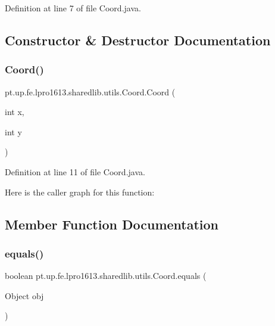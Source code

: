 Definition at line 7 of file Coord.\+java.



\subsection{Constructor \& Destructor Documentation}
\hypertarget{classpt_1_1up_1_1fe_1_1lpro1613_1_1sharedlib_1_1utils_1_1_coord_a43ebef088b4a7b390ac60f7fb4a200bb}{}\label{classpt_1_1up_1_1fe_1_1lpro1613_1_1sharedlib_1_1utils_1_1_coord_a43ebef088b4a7b390ac60f7fb4a200bb} 
\subsubsection{\texorpdfstring{Coord()}{Coord()}}
{\footnotesize\ttfamily pt.\+up.\+fe.\+lpro1613.\+sharedlib.\+utils.\+Coord.\+Coord (\begin{DoxyParamCaption}\item[{int}]{x,  }\item[{int}]{y }\end{DoxyParamCaption})}



Definition at line 11 of file Coord.\+java.

Here is the caller graph for this function\+:


\subsection{Member Function Documentation}
\hypertarget{classpt_1_1up_1_1fe_1_1lpro1613_1_1sharedlib_1_1utils_1_1_coord_ab7b6eb36dbf1fe7df81fb9cfedeed2eb}{}\label{classpt_1_1up_1_1fe_1_1lpro1613_1_1sharedlib_1_1utils_1_1_coord_ab7b6eb36dbf1fe7df81fb9cfedeed2eb} 
\subsubsection{\texorpdfstring{equals()}{equals()}}
{\footnotesize\ttfamily boolean pt.\+up.\+fe.\+lpro1613.\+sharedlib.\+utils.\+Coord.\+equals (\begin{DoxyParamCaption}\item[{Object}]{obj }\end{DoxyParamCaption})}



